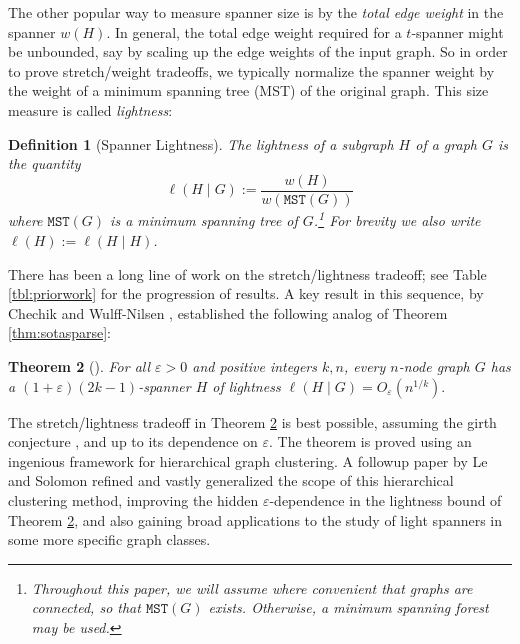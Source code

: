 \documentclass{article}\usepackage[a4paper,margin=20mm]{geometry}
\newtheorem{theorem}{Theorem}\newtheorem{lemma}[theorem]{Lemma}\newtheorem{proposition}[theorem]{Proposition}\newtheorem{corollary}[theorem]{Corollary}\newtheorem{definition}[theorem]{Definition}\newtheorem{claim}[theorem]{Claim}\newtheorem{remark}[theorem]{Remark}\newtheorem{observation}[theorem]{Observation}\newtheorem{conjecture}[theorem]{Conjecture}\newtheorem{example}[theorem]{Example}
\newcommand{\eps}{\varepsilon}
\newcommand{\mst}{\texttt{MST}}
\begin{document}
The other popular way to measure spanner size is by the \emph{total edge weight} in the spanner $w(H)$.
In general, the total edge weight required for a $t$-spanner might be unbounded, say by scaling up the edge weights of the input graph.
So in order to prove stretch/weight tradeoffs, we typically normalize the spanner weight by the weight of a minimum spanning tree (MST) of the original graph.
This size measure is called \emph{lightness}:
\begin{definition} [Spanner Lightness]
The lightness of a subgraph $H$ of a graph $G$ is the quantity
$$\ell(H \mid G) := \frac{w(H)}{w(\mst(G))}$$
where $\mst(G)$ is a minimum spanning tree of $G$.\footnote{Throughout this paper, we will assume where convenient that graphs are connected, so that $\mst(G)$ exists.  Otherwise, a minimum spanning forest may be used.}
For brevity we also write $\ell(H) := \ell(H \mid H)$.
\end{definition}

There has been a long line of work on the stretch/lightness tradeoff; see Table \ref{tbl:priorwork} for the progression of results.
A key result in this sequence, by Chechik and Wulff-Nilsen \cite{CW18}, established the following analog of Theorem \ref{thm:sotasparse}:

\begin{theorem} [\cite{CW18}] \label{thm:sotalight}
For all $\eps>0$ and positive integers $k, n$, every $n$-node graph $G$ has a $(1+\eps)(2k-1)$-spanner $H$ of lightness
$\ell(H \mid G) = O_{\eps}\left( n^{1/k} \right).$
\end{theorem}

The stretch/lightness tradeoff in Theorem \ref{thm:sotalight} is best possible, assuming the girth conjecture \cite{girth}, and up to its dependence on $\eps$.
The theorem is proved using an ingenious framework for hierarchical graph clustering.
A followup paper by Le and Solomon \cite{LS23} refined and vastly generalized the scope of this hierarchical clustering method, improving the hidden $\eps$-dependence in the lightness bound of Theorem \ref{thm:sotalight}, and also gaining broad applications to the study of light spanners in some more specific graph classes.
\end{document}
